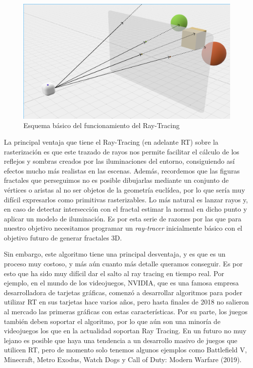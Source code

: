 \begin{figure} [ht]
    \centering
    \includegraphics[scale = 0.35]{img/C7/RT.png}
    \caption{Esquema básico del funcionamiento del Ray-Tracing}
    \label{fig:RT}
\end{figure}

La principal ventaja que tiene el Ray-Tracing (en adelante RT) sobre la rasterización es que este trazado de rayos nos permite facilitar el cálculo de los reflejos y sombras creados por las iluminaciones del entorno, consiguiendo así efectos mucho más realistas en las escenas. Además, recordemos que las figuras fractales que perseguimos no es posible dibujarlas mediante un conjunto de vértices o aristas al no ser objetos de la geometría euclídea, por lo que sería muy difícil expresarlos como primitivas rasterizables. Lo más natural es lanzar rayos y, en caso de detectar intersección con el fractal estimar la normal en dicho punto y aplicar un modelo de iluminación. Es por esta serie de razones por las que para nuestro objetivo necesitamos programar un \textit{ray-tracer} inicialmente básico con el objetivo futuro de generar fractales 3D.

Sin embargo, este algoritmo tiene una principal desventaja, y es que es un proceso muy costoso, y más aún cuanto más detalle queramos conseguir. Es por esto que ha sido muy difícil dar el salto al ray tracing en tiempo real. Por ejemplo, en el mundo de los videojuegos, NVIDIA, que es una famosa empresa desarrolladora de tarjetas gráficas, comenzó a desarrollar algoritmos para poder utilizar RT en sus tarjetas hace varios años, pero hasta finales de 2018 no salieron al mercado las primeras gráficas con estas características. Por su parte, los juegos también deben soportar el algoritmo, por lo que aún son una minoría de videojuegos los que en la actualidad soportan Ray Tracing. En un futuro no muy lejano es posible que haya una tendencia a un desarrollo masivo de juegos que utilicen RT, pero de momento solo tenemos algunos ejemplos como Battlefield V, Minecraft, Metro Exodus, Watch Dogs y Call of Duty: Modern Warfare (2019).

